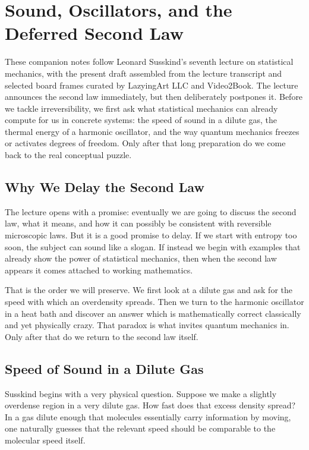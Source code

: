 \chapter{Sound, Oscillators, and the Deferred Second Law}

These companion notes follow Leonard Susskind's seventh lecture on statistical mechanics, with the present draft assembled from the lecture transcript and selected board frames curated by LazyingArt LLC and Video2Book. The lecture announces the second law immediately, but then deliberately postpones it. Before we tackle irreversibility, we first ask what statistical mechanics can already compute for us in concrete systems: the speed of sound in a dilute gas, the thermal energy of a harmonic oscillator, and the way quantum mechanics freezes or activates degrees of freedom. Only after that long preparation do we come back to the real conceptual puzzle.

\section{Why We Delay the Second Law}

The lecture opens with a promise: eventually we are going to discuss the second law, what it means, and how it can possibly be consistent with reversible microscopic laws. But it is a good promise to delay. If we start with entropy too soon, the subject can sound like a slogan. If instead we begin with examples that already show the power of statistical mechanics, then when the second law appears it comes attached to working mathematics.

That is the order we will preserve. We first look at a dilute gas and ask for the speed with which an overdensity spreads. Then we turn to the harmonic oscillator in a heat bath and discover an answer which is mathematically correct classically and yet physically crazy. That paradox is what invites quantum mechanics in. Only after that do we return to the second law itself.

\section{Speed of Sound in a Dilute Gas}

Susskind begins with a very physical question. Suppose we make a slightly overdense region in a very dilute gas. How fast does that excess density spread? In a gas dilute enough that molecules essentially carry information by moving, one naturally guesses that the relevant speed should be comparable to the molecular speed itself.

